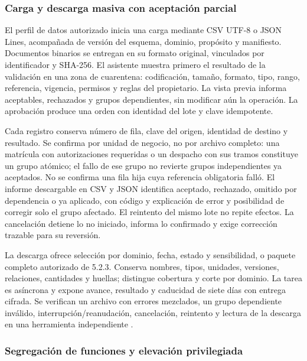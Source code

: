 \subsubsection{Carga y descarga masiva con aceptación parcial}
\label{subsec:sd5_masiva_cierre}

El perfil de datos autorizado inicia una carga mediante CSV UTF-8 o JSON Lines, acompañada de versión del esquema, dominio, propósito y manifiesto. Documentos binarios se entregan en su formato original, vinculados por identificador y SHA-256. El asistente muestra primero el resultado de la validación en una zona de cuarentena: codificación, tamaño, formato, tipo, rango, referencia, vigencia, permisos y reglas del propietario. La vista previa informa aceptables, rechazados y grupos dependientes, sin modificar aún la operación. La aprobación produce una orden con identidad del lote y clave idempotente.

Cada registro conserva número de fila, clave del origen, identidad de destino y resultado. Se confirma por unidad de negocio, no por archivo completo: una matrícula con autorizaciones requeridas o un despacho con sus tramos constituye un grupo atómico; el fallo de ese grupo no revierte grupos independientes ya aceptados. No se confirma una fila hija cuya referencia obligatoria falló. El informe descargable en CSV y JSON identifica aceptado, rechazado, omitido por dependencia o ya aplicado, con código y explicación de error y posibilidad de corregir solo el grupo afectado. El reintento del mismo lote no repite efectos. La cancelación detiene lo no iniciado, informa lo confirmado y exige corrección trazable para su reversión.

La descarga ofrece selección por dominio, fecha, estado y sensibilidad, o paquete completo autorizado de 5.2.3. Conserva nombres, tipos, unidades, versiones, relaciones, cantidades y huellas; distingue cobertura y corte por dominio. La tarea es asíncrona y expone avance, resultado y caducidad de siete días con entrega cifrada. Se verifican un archivo con errores mezclados, un grupo dependiente inválido, interrupción/reanudación, cancelación, reintento y lectura de la descarga en una herramienta independiente \parencite[RT-05.06 y RT-05.22]{bases-transversales}.

\subsubsection{Segregación de funciones y elevación privilegiada}
\label{subsec:sd5_segregacion_cierre}

